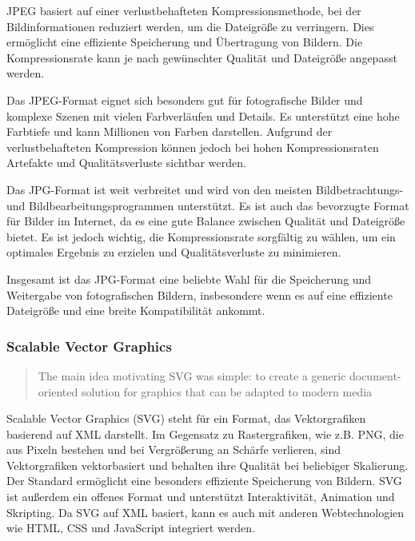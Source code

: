     \ac{JPEG} basiert auf einer verlustbehafteten Kompressionsmethode, bei der Bildinformationen reduziert werden, um die Dateigröße zu verringern. Dies ermöglicht eine effiziente Speicherung und Übertragung von Bildern. Die Kompressionsrate kann je nach gewünschter Qualität und Dateigröße angepasst werden.
    
    Das \ac{JPEG}-Format eignet sich besonders gut für fotografische Bilder und komplexe Szenen mit vielen Farbverläufen und Details. Es unterstützt eine hohe Farbtiefe und kann Millionen von Farben darstellen. Aufgrund der verlustbehafteten Kompression können jedoch bei hohen Kompressionsraten Artefakte und Qualitätsverluste sichtbar werden.
    
    Das \ac{JPG}-Format ist weit verbreitet und wird von den meisten Bildbetrachtungs- und Bildbearbeitungsprogrammen unterstützt. Es ist auch das bevorzugte Format für Bilder im Internet, da es eine gute Balance zwischen Qualität und Dateigröße bietet. Es ist jedoch wichtig, die Kompressionsrate sorgfältig zu wählen, um ein optimales Ergebnis zu erzielen und Qualitätsverluste zu minimieren.
    
    Insgesamt ist das \ac{JPG}-Format eine beliebte Wahl für die Speicherung und Weitergabe von fotografischen Bildern, insbesondere wenn es auf eine effiziente Dateigröße und eine breite Kompatibilität ankommt.
            
    
    \subsubsection{Scalable Vector Graphics}
    \begin{quote}
        The main idea motivating \ac{SVG} was simple: to create a generic document-oriented solution  for graphics that can be adapted to modern media
        \grqq{}~
    \end{quote}
    Scalable Vector Graphics (SVG) steht für ein Format, das Vektorgrafiken basierend auf \ac{XML} darstellt.
    Im Gegensatz zu Rastergrafiken, wie z.B. PNG, die aus Pixeln bestehen und bei Vergrößerung an Schärfe verlieren, sind Vektorgrafiken vektorbasiert und behalten ihre Qualität bei beliebiger Skalierung. 
    Der Standard ermöglicht eine besonders effiziente Speicherung von Bildern.
    SVG ist außerdem ein offenes Format und unterstützt Interaktivität, Animation und Skripting. 
    Da SVG auf XML basiert, kann es auch mit anderen Webtechnologien wie HTML, \ac{CSS} und JavaScript integriert werden. 
        
